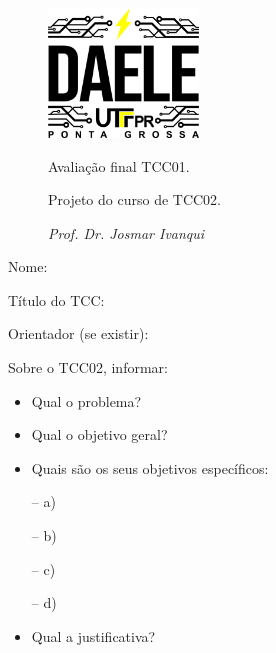 \documentclass[12pt, a4paper]{article}
\begin{document}
\begin{figure}[htb]
\hspace{0.5cm}
\begin{minipage}[b]{0.3\linewidth}
    \includegraphics[width=4cm]{proj/logo.png}
\end{minipage}
\begin{minipage}[b]{0.65\linewidth}
\begin{huge}
Avaliação final TCC01.
\vspace{\baselineskip}
\end{huge}

\begin{Large}
Projeto do curso de TCC02.

\medskip 
\textit{Prof. \hspace{1.5mm}Dr. \hspace{1.5mm}Josmar \hspace{1mm}Ivanqui}
\end{Large}
\smallskip 
\end{minipage}
\end{figure}
\vspace{0.6\baselineskip}

Nome:\hrulefill
\vspace{\baselineskip}

Título do TCC:\hrulefill
\vspace{\baselineskip}

Orientador (se existir):\hrulefill
\vspace{3\baselineskip}


Sobre o TCC02, informar:
\vspace{0.8\baselineskip}

\begin{itemize}
    \item Qual o problema?\hrulefill
    \item Qual o objetivo geral?\hrulefill
    \item Quais são os seus objetivos específicos:
    \vspace{0.3\baselineskip}

    \hspace{0.6cm}– a)\hrulefill
 
    \hspace{0.6cm}– b)\hrulefill

    \hspace{0.6cm}– c)\hrulefill

    \hspace{0.6cm}– d)\hrulefill

    \item Qual a justificativa?\hrulefill
\end{itemize}
\end{document}
